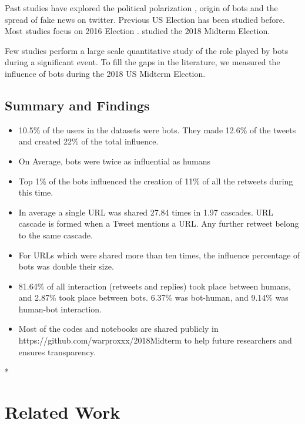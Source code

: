 \documentclass[letterpaper]{article}
\begin{document}
Past studies have explored the political polarization \cite{munger2017don,rizoiu2018debatenight,gruzd2014investigating,bovet2019influence}, origin of bots 
\cite{zannettou2019let,zannettou2019characterizing} and the spread of fake news \cite{vosoughi2018spread,shao2018spread,lazer2018science,bovet2019influence,grinberg2019fake}
on twitter. Previous US Election has been studied before. Most studies focus on 2016 Election \cite{bovet2019influence,rizoiu2018debatenight,bessi2016social,howard2018algorithms,howard2016bots}. \cite{deb2019perils} 
studied the 2018 Midterm Election.\par 

Few studies perform a large scale quantitative study of the role played by bots during a significant event. To fill the gaps in the literature, 
we measured the influence of bots during the 2018 US Midterm Election. \par


\subsection{Summary and Findings}

\begin{itemize}
    \item 10.5\% of the users in the datasets were bots. They made 12.6\% of the tweets and created 22\% of the total influence.
    \item On Average, bots were twice as influential as humans
    \item Top 1\% of the bots influenced the creation of 11\% of all the retweets during this time.
    \item In average a single URL was shared 27.84 times in 1.97 cascades. URL cascade is formed when a Tweet mentions a URL. Any further retweet belong to the same cascade.
    \item For URLs which were shared more than ten times, the influence percentage of bots was double their size.
    \item 81.64\% of all interaction (retweets and replies) took place between humans, and 2.87\% took place between bots. 6.37\% was bot-human, and 9.14\% was human-bot interaction.
    \item Most of the codes and notebooks are shared publicly in https://github.com/warproxxx/2018Midterm to help future researchers and ensures transparency.
\end{itemize}

*
\section{Related Work}
\label{sec:related}
\end{document}

